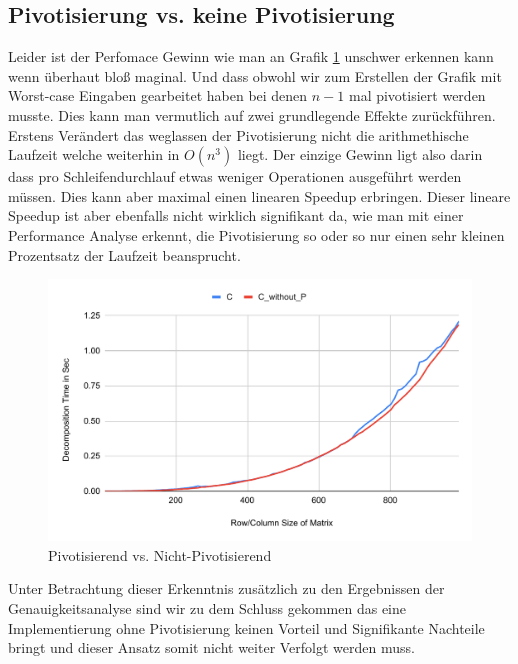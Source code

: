 \documentclass[course=erap]{aspdoc}
\begin{document}
\subsection{Pivotisierung vs. keine Pivotisierung}
Leider ist der Perfomace Gewinn wie man an Grafik \ref{PvsNP} unschwer erkennen kann wenn überhaut bloß maginal. Und dass obwohl wir zum Erstellen der Grafik mit Worst-case Eingaben gearbeitet haben bei denen $n-1$ mal pivotisiert werden musste.
Dies kann man vermutlich auf zwei grundlegende Effekte zurückführen. Erstens Verändert das weglassen der Pivotisierung nicht die
arithmethische Laufzeit welche weiterhin in $O(n^3)$ liegt. Der einzige Gewinn ligt also darin dass pro Schleifendurchlauf etwas weniger Operationen ausgeführt werden müssen. Dies kann aber maximal einen linearen Speedup erbringen. 
Dieser lineare Speedup ist aber ebenfalls nicht wirklich signifikant da, wie man mit einer Performance Analyse erkennt, die Pivotisierung so oder so nur einen sehr kleinen Prozentsatz der Laufzeit beansprucht. 
  \begin{figure}[H]
  \begin{center}
  \caption{Pivotisierend vs. Nicht-Pivotisierend} 
  \label{PvsNP}
  \includegraphics[width = 0.8\linewidth]{PvsNP.pdf}
  \end{center}
  \end{figure}
Unter Betrachtung dieser Erkenntnis zusätzlich zu den Ergebnissen der Genauigkeitsanalyse sind wir zu dem Schluss gekommen das eine Implementierung ohne Pivotisierung keinen Vorteil und Signifikante Nachteile bringt und dieser
Ansatz somit nicht weiter Verfolgt werden muss.
\end{document}
